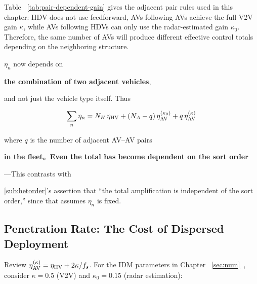 \documentclass[11pt,a4paper,openany]{book}
\numberwithin{equation}{chapter}
\numberwithin{figure}{chapter}
\numberwithin{table}{chapter}
\begin{document}
Table ~\ref{tab:pair-dependent-gain} gives the adjacent pair rules used in this chapter: HDV does not use feedforward, AVs following AVs achieve the full V2V gain $\kappa$, while AVs following HDVs can only use the radar-estimated gain $\kappa_0$. Therefore, the same number of AVs will produce different effective control totals depending on the neighboring structure.










\begin{tcolorbox}[notebox,title=\textbf{This introduces a new structural effect}]

$\eta_n$ now depends on




\textbf{the combination of two adjacent vehicles},




 and not just the vehicle type itself. Thus

\[
\sum_{n}\eta_n = N_H\,\eta_{\rm HV} + \left(N_A-q\right)\eta_{\rm AV}^{(\kappa_0)} + q\,\eta_{\rm AV}^{(\kappa)}
\]

where $q$ is the number of adjacent AV--AV pairs




\textbf{in the fleet}。\textbf{Even the total has become dependent on the sort order}




—This contrasts with





\ref{sub:hetorder}’s assertion that “the total amplification is independent of the sort order,” since that assumes $\eta_n$ is fixed.







\end{tcolorbox}

\subsection{Penetration Rate: The Cost of Dispersed Deployment}










Review $\eta_{\rm AV}^{(\kappa)} = \eta_{\rm HV} + 2\kappa/f_s$. For the IDM parameters in Chapter ~\ref{sec:num}~, consider $\kappa=0.5$ (V2V) and $\kappa_0=0.15$ (radar estimation):
\end{document}
